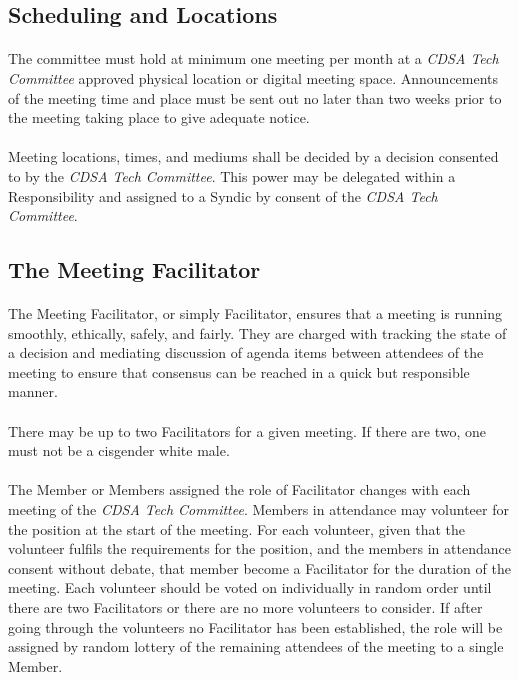 \documentclass[12pt,letter,twocolumn,oneside,draft]{article}
\newcommand{\cname}{\emph{CDSA Tech Committee}}
\begin{document}
\subsection{Scheduling and Locations}

\paragraph{}
The committee must hold at minimum one meeting per month at a \cname{} approved
physical location or digital meeting space. Announcements of the meeting time
and place must be sent out no later than two weeks prior to the meeting taking
place to give adequate notice.

\paragraph{}
Meeting locations, times, and mediums shall be decided by a decision consented
to by the \cname{}. This power may be delegated within a Responsibility and
assigned to a Syndic by consent of the \cname{}.

\subsection{The Meeting Facilitator}

\paragraph{}
The Meeting Facilitator, or simply Facilitator, ensures that a meeting is
running smoothly, ethically, safely, and fairly. They are charged with tracking
the state of a decision and mediating discussion of agenda items between
attendees of the meeting to ensure that consensus can be reached in a quick but
responsible manner.

\paragraph{}
There may be up to two Facilitators for a given meeting. If there are two, one
must not be a cisgender white male.

\paragraph{} 
The Member or Members assigned the role of Facilitator changes with each
meeting of the \cname{}. Members in attendance may volunteer for the position
at the start of the meeting. For each volunteer, given that the volunteer
fulfils the requirements for the position, and the members in attendance
consent without debate, that member become a Facilitator for the duration of
the meeting. Each volunteer should be voted on individually in random order
until there are two Facilitators or there are no more volunteers to consider.
If after going through the volunteers no Facilitator has been established, the
role will be assigned by random lottery of the remaining attendees of the
meeting to a single Member. 
\end{document}
